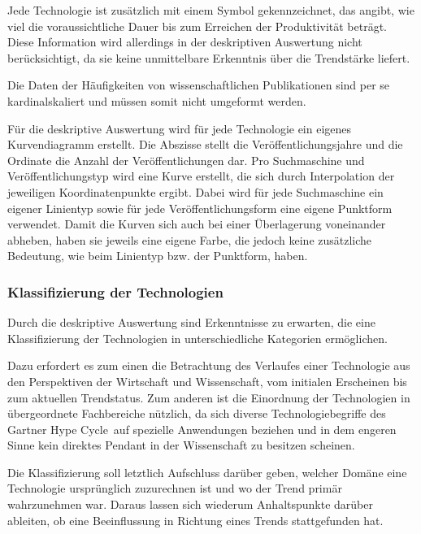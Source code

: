 Jede Technologie ist zusätzlich mit einem Symbol gekennzeichnet, das angibt, wie viel die voraussichtliche Dauer bis zum Erreichen der Produktivität beträgt. Diese Information wird allerdings in der deskriptiven Auswertung nicht berücksichtigt, da sie keine unmittelbare Erkenntnis über die Trendstärke liefert.

Die Daten der Häufigkeiten von wissenschaftlichen Publikationen sind per se kardinalskaliert und müssen somit nicht umgeformt werden.

Für die deskriptive Auswertung wird für jede Technologie ein eigenes Kurvendiagramm erstellt. Die Abszisse stellt die Veröffentlichungsjahre und die Ordinate die Anzahl der Veröffentlichungen dar. Pro Suchmaschine und Veröffentlichungstyp wird eine Kurve erstellt, die sich durch Interpolation der jeweiligen Koordinatenpunkte ergibt. Dabei wird für jede Suchmaschine ein eigener Linientyp sowie für jede Veröffentlichungsform eine eigene Punktform verwendet. Damit die Kurven sich auch bei einer Überlagerung voneinander abheben, haben sie jeweils eine eigene Farbe, die jedoch keine zusätzliche Bedeutung, wie beim Linientyp bzw. der Punktform, haben.

\subsubsection{Klassifizierung der Technologien}
Durch die deskriptive Auswertung sind Erkenntnisse zu erwarten, die eine Klassifizierung der Technologien in unterschiedliche Kategorien ermöglichen.


Dazu erfordert es zum einen die Betrachtung des Verlaufes einer Technologie aus den Perspektiven der Wirtschaft und Wissenschaft, vom initialen Erscheinen bis zum aktuellen Trendstatus. Zum anderen ist die Einordnung der Technologien in übergeordnete Fachbereiche nützlich, da sich diverse Technologiebegriffe des \glqq Gartner Hype Cycle\grqq~auf spezielle Anwendungen beziehen und in dem engeren Sinne kein direktes Pendant in der Wissenschaft zu besitzen scheinen.

Die Klassifizierung soll letztlich Aufschluss darüber geben, welcher Domäne eine Technologie ursprünglich zuzurechnen ist und wo der Trend primär wahrzunehmen war. Daraus lassen sich wiederum Anhaltspunkte darüber ableiten, ob eine Beeinflussung in Richtung eines Trends stattgefunden hat.



